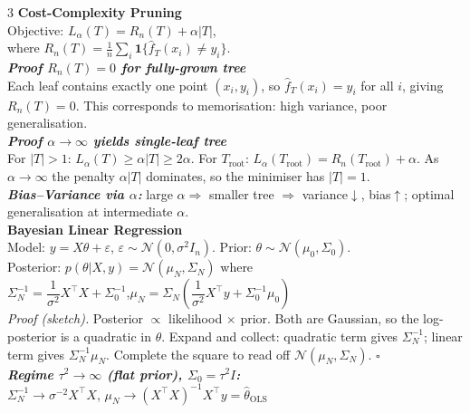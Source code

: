 \documentclass[a4paper,7pt]{article}
\begin{document}
\begin{multicols*}{3}
\textbf{Cost-Complexity Pruning}\\
Objective: $L_\alpha(T)=R_n(T)+\alpha|T|$, \\ where $R_n(T)=\frac{1}{n}\sum_i\mathbf{1}\{\hat f_T(x_i)\neq y_i\}$.\\

\textit{\textbf{Proof $R_n(T)=0$ for fully-grown tree}}\\
Each leaf contains exactly one point $(x_i,y_i)$, so $\hat f_T(x_i)=y_i$ for all $i$, giving $R_n(T)=0$. This corresponds to memorisation: high variance, poor generalisation.\\

\textit{\textbf{Proof $\alpha\to\infty$ yields single-leaf tree}}\\
For $|T|>1$: $L_\alpha(T)\geq\alpha|T|\geq 2\alpha$. For $T_\mathrm{root}$: $L_\alpha(T_\mathrm{root})=R_n(T_\mathrm{root})+\alpha$. As $\alpha\to\infty$ the penalty $\alpha|T|$ dominates, so the minimiser has $|T|=1$.\\

\textit{\textbf{Bias--Variance via $\alpha$:}} large $\alpha\Rightarrow$ smaller tree $\Rightarrow$ variance$\downarrow$, bias$\uparrow$; optimal generalisation at intermediate $\alpha$.\\

\textbf{Bayesian Linear Regression}\\
Model: $y=X\theta+\varepsilon$, $\varepsilon\sim\mathcal{N}(0,\sigma^2 I_n)$. Prior: $\theta\sim\mathcal{N}(\mu_0,\Sigma_0)$.\\
Posterior: $p(\theta|X,y)=\mathcal{N}(\mu_N,\Sigma_N)$ where\\
$\Sigma_N^{-1}=\dfrac{1}{\sigma^2}X^\top X+\Sigma_0^{-1}$,\quad $\mu_N=\Sigma_N\!\left(\dfrac{1}{\sigma^2}X^\top y+\Sigma_0^{-1}\mu_0\right)$\\
\textit{Proof (sketch).} Posterior $\propto$ likelihood $\times$ prior. Both are Gaussian, so the log-posterior is a quadratic in $\theta$. Expand and collect: quadratic term gives $\Sigma_N^{-1}$; linear term gives $\Sigma_N^{-1}\mu_N$. Complete the square to read off $\mathcal{N}(\mu_N,\Sigma_N)$. \hfill$\square$\\

\textit{\textbf{Regime $\tau^2\to\infty$ (flat prior), $\Sigma_0=\tau^2 I$:}}\\
$\Sigma_N^{-1}\to\sigma^{-2}X^\top X$, $\mu_N\to(X^\top X)^{-1}X^\top y=\hat\theta_\mathrm{OLS}$\\


\end{multicols*}
\end{document}

